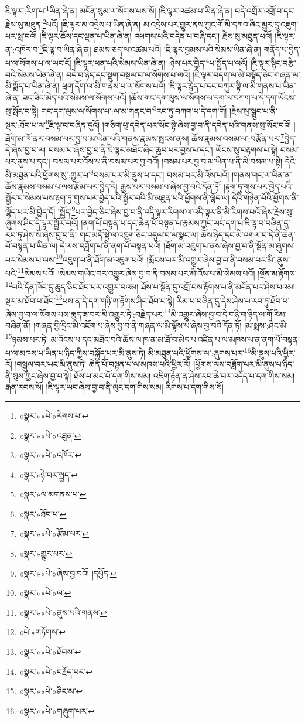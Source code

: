 ཇི་ལྟར་:རིག་པ་\footnote{«སྣར་»«པེ་»རིགས་པ་}ཡིན་ཞེ་ན། མངོན་སུམ་ལ་སོགས་པས་སོ། །ཇི་ལྟར་འཚམ་པ་ཡིན་ཞེ་ན། བདེ་འགྲོར་འགྲོ་བ་དང་རྗེས་སུ་མཐུན་\footnote{«སྣར་»«པེ་»འཐུན་}པའོ། །ཇི་ལྟར་མ་འདྲེས་པ་ཡིན་ཞེ་ན། མ་འདྲེས་པར་གྱུར་ནས་ཀྱང་གོ་མི་དཀའ་ཞིང་མྱུར་དུ་འཇུག་པར་སླ་བའོ། །ཇི་ལྟར་ཆོས་དང་ལྡན་པ་ཡིན་ཞེ་ན། འཕགས་པའི་བདེན་པ་བཞི་དང་། རྗེས་སུ་མཐུན་པའོ། །ཇི་ལྟར་ན་:འཁོར་བ་\footnote{«སྣར་»«པེ་»འཁོར་}ཇི་ལྟ་བ་ཡིན་ཞེ་ན། ཐམས་ཅད་ལ་འཚམ་པའོ། །ཇི་ལྟར་བྱམས་པའི་སེམས་ཡིན་ཞེ་ན། གནོད་པ་བྱེད་པ་ལ་སོགས་པ་ལ་ཡང་ངོ། །ཇི་ལྟར་ཕན་པའི་སེམས་ཡིན་ཞེ་ན། :ཉེས་པར་བྱེད་\footnote{«སྣར་»ཉེ་བར་སྤྱད་}པ་སྤྱོད་པ་ལའོ། །ཇི་ལྟར་སྙིང་བརྩེ་བའི་སེམས་ཡིན་ཞེ་ན། བདེ་བ་ཉིད་དང་སྡུག་བསྔལ་བ་ལ་སོགས་པ་ལའོ། །ཇི་ལྟར་བདག་ལ་མི་བསྟོད་ཅིང་གཞན་ལ་མི་སྨོད་པ་ཡིན་ཞེ་ན། ཕྲག་དོག་ལ་མི་གནས་པ་ལ་སོགས་པའོ། །ཇི་ལྟར་རྙེད་པ་དང་བཀུར་སྟི་ལ་མི་གནས་པ་ཡིན་ཞེ་ན། ཟང་ཟིང་མེད་པའི་སེམས་ལ་སོགས་པའོ། །ཆོས་གང་དག་ལུས་ལ་སོགས་པ་དག་ལ་བཀག་པ་དེ་དག་ཡོངས་སུ་སྤོང་བ་སྟེ། གང་དག་ལུས་ལ་སོགས་པ་:ལ་མ་གནང་བ་\footnote{«སྣར་»ལ་མགནས་པ་}རབ་ཏུ་བཀག་པ་དེ་དག་གོ། །རྗེས་སུ་སྒྲུབ་པ་ནི་སྔར་:ཐོབ་པ་ལ་\footnote{«སྣར་»ཐོབ་པ་}ཇི་ལྟ་བ་བཞིན་དུའོ། །གཅིག་པུ་དབེན་པར་སོང་སྟེ་ཞེས་བྱ་བ་ནི་དབེན་པའི་གནས་སུ་སོང་བའོ། །ཐོག་མ་ཁོ་ནར་བསམ་པར་བྱ་བ་མ་ཡིན་པའི་གནས་རྣམས་སྤངས་ནས། ཆོས་རྣམས་བསམ་པ་:བརྩོན་པར་\footnote{«སྣར་»«པེ་»རྩོམ་པར་}བྱེད་དེ་ཞེས་བྱ་བ་ལ། བསམ་པ་ཞེས་བྱ་བ་ནི་ཇི་ལྟར་མཐོང་ཞིང་ཆུབ་པར་བྱས་པ་དང་། ཡོངས་སུ་བརྟགས་པ་སྟེ། བསམ་པར་ནུས་པ་དང་། བསམ་པར་འོས་པ་ནི་བསམ་པར་བྱ་བའོ། །བསམ་པར་བྱ་བ་མ་ཡིན་པ་ནི་མི་བསམ་པ་སྟེ། དེའི་མི་མཐུན་པའི་ཕྱོགས་སུ་:གྱུར་པ་\footnote{«སྣར་»གྱུར་པར་}བསམ་པར་མི་ནུས་པ་དང་། བསམ་པར་མི་འོས་པའོ། །གནས་གང་ལ་ཡིན་ན་ཆོས་རྣམས་བསམ་པ་ལས་རྩོམ་པར་བྱེད་དེ། རྒྱས་པར་བསམ་པ་ཞེས་བྱ་བའི་དོན་ཏོ། །རྟག་ཏུ་གུས་པར་བྱེད་པའི་སྦྱོར་བ་སེམས་པས་རྟག་ཏུ་གུས་པར་བྱེད་པའི་སྦྱོར་བའི་མི་མཐུན་པའི་ཕྱོགས་ནི་ལྷོད་ལ། དེའི་གཉེན་པོའི་ཕྱོགས་ནི་ལྷོད་པར་མི་བྱེད་དོ། །སྤྱོད་\footnote{«སྣར་»«པེ་»ཞེས་བྱ་བའོ། །དཔྱོད་}པར་བྱེད་ཅིང་ཞེས་བྱ་བ་ནི་འདི་ལྟར་རིགས་ལ་འདི་ལྟར་ནི་མི་རིགས་པའོ་ཞེས་རྗེས་སུ་ཞུགས་ཤིང་དེ་ལྟར་སྦྱོར་བའོ། །ནག་པོ་བསྟན་པ་དང་ཆེན་པོ་བསྟན་པ་རྣམས་ཀྱང་ཡང་དག་པ་ཇི་ལྟ་བ་བཞིན་དུ་རབ་ཏུ་ཤེས་སོ་ཞེས་བྱ་བ་ནི། གང་མདོ་སྡེ་ལ་འཇུག་ཅིང་འདུལ་བ་ལ་སྣང་ལ། ཆོས་ཉིད་དང་མི་འགལ་བ་དེ་ནི་ཆེན་པོ་བསྟན་པ་ཡིན་ལ། དེ་ལས་བཟློག་པ་ནི་ནག་པོ་བསྟན་པའོ། །ཐོག་མ་འཇུག་པ་ནས་ཞེས་བྱ་བ་ནི་སྔོན་མ་ཞུགས་པར་སེམས་པ་ལས་\footnote{«སྣར་»«པེ་»ལ་}འཇུག་པ་ནི་ཐོག་མ་འཇུག་པའོ། །རྨོངས་པར་མི་འགྱུར་ཞེས་བྱ་བ་ནི་བསམ་པར་མི་:ནུས་པའི་\footnote{«སྣར་»«པེ་»ནུས་པའི་གནས་}སེམས་པའོ། །སེམས་གཡེང་བར་འགྱུར་ཞེས་བྱ་བ་ནི་བསམ་པར་མི་འོས་པ་མི་སེམས་པའོ། །སྔོན་མ་རྟོགས་\footnote{«པེ་»གཏོགས་}པའི་དོན་ཁོང་དུ་ཆུད་ཅིང་ཐོབ་པར་འགྱུར་བའམ། ཐོས་པ་སྔོན་དུ་འགྲོ་བས་རྟོགས་པ་ནི་མངོན་པར་ཤེས་པའམ། སྔར་མ་ཐོབ་པ་ཐོབ་\footnote{«སྣར་»«པེ་»ཐོབས་}པས་ན་དེ་དག་གཉི་ག་རྟོགས་ཤིང་ཐོབ་པ་སྟེ། རིམ་པ་བཞིན་དུ་དེས་ཤེས་པ་རབ་ཏུ་ཐོབ་པ་ཞེས་བྱ་བ་ལ་སོགས་པས་ཆུད་ཟ་བར་མི་འགྱུར་ཏེ་:བརྗེད་པར་\footnote{«སྣར་»«པེ་»བརྗོད་པར་}མི་འགྱུར་ཞེས་བྱ་བ་དེ་གཉི་ག་ཉིད་ལ་གོ་རིམ་བཞིན་ནོ། །གཞན་གྱི་དྲིང་མི་འཇོག་པ་ཞེས་བྱ་བ་ནི་གཞན་ལ་མི་ལྟོས་པ་ཞེས་བྱ་བའི་དོན་ཏོ། །མ་སྨས་:ཤིང་མི་\footnote{«སྣར་»«པེ་»ཤིང་མ་}ཉམས་པར་ཏེ། མ་འོངས་པ་དང་མཐོང་བའི་ཆོས་ལ་ཁ་ན་མ་ཐོ་བ་མེད་པ་འཛིན་པ་ལ་མཁས་པ་ན་ནག་པོ་བསྟན་པ་ལ་མཁས་པ་ཡིན་པ་ཉིད་ཀྱིས་བསྐྱོད་པར་མི་ནུས་ཏེ། མི་མཐུན་པའི་ཕྱོགས་ལ་:ཞུགས་པར་\footnote{«སྣར་»«པེ་»གཞུག་པར་}མི་ནུས་པའི་ཕྱིར་རོ། །བསྒུལ་བར་ཡང་མི་ནུས་ཏེ། ཆེན་པོ་བསྟན་པ་ལ་མཁས་པའི་ཕྱིར་རོ། །ཕྱོགས་ལས་བཟློག་པར་མི་ནུས་པ་ཉིད་ནི་སུས་ཀྱང་ཞེས་བྱ་བ་སྟེ། ཐོས་པ་མང་པོ་དག་གིས་སམ། འཇིག་རྟེན་ན་ཤེས་རབ་ཆེ་བར་འདོད་པ་དག་གིས་སམ། རྒན་རབས་སོ། །ཇི་ལྟར་ཡང་ཞེས་བྱ་བ་ནི་ལུང་དག་གིས་སམ། རིགས་པ་དག་གིས་སོ། 